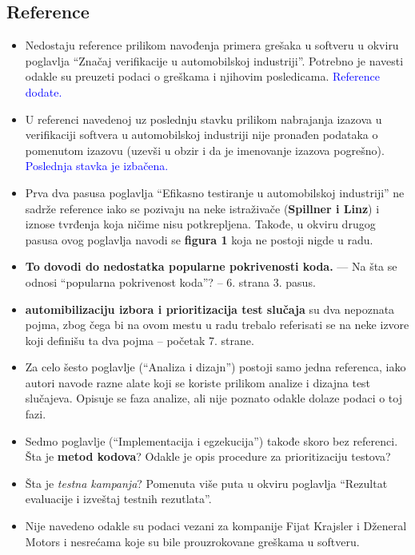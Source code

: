 \documentclass[a4paper]{report}
\newcommand{\odgovor}[1]{\textcolor{blue}{#1}}
\begin{document}
\subsection{Reference}
\begin{itemize}
\item Nedostaju reference prilikom navođenja primera grešaka u softveru u okviru poglavlja ``Značaj verifikacije u automobilskoj industriji''. Potrebno je navesti odakle su preuzeti podaci o greškama i njihovim posledicama. \odgovor{Reference dodate.}
\item U referenci navedenoj uz poslednju stavku prilikom nabrajanja izazova u verifikaciji softvera u automobilskoj industriji nije pronađen podataka o pomenutom izazovu (uzevši u obzir i da je imenovanje izazova pogrešno). \odgovor{Poslednja stavka je izbačena.}
\item Prva dva pasusa poglavlja ``Efikasno testiranje u automobilskoj industriji'' ne sadrže reference iako se pozivaju na neke istraživače ({\bf{Spillner i Linz}}) i iznose tvrđenja koja ničime nisu potkrepljena. Takođe, u okviru drugog pasusa ovog poglavlja navodi se {\bf{figura 1}} koja ne postoji nigde u radu.
\item {\bf{To dovodi do nedostatka popularne pokrivenosti koda.}} --- Na šta se odnosi ``popularna pokrivenost koda''? -- 6. strana 3. pasus. \odgovor{}
\item {\bf{automibilizaciju izbora i prioritizacija test slučaja}} su dva nepoznata pojma, zbog čega bi na ovom mestu u radu trebalo referisati se na neke izvore koji definišu ta dva pojma -- početak 7. strane.
\item Za celo šesto poglavlje (``Analiza i dizajn'') postoji samo jedna referenca, iako autori navode razne alate koji se koriste prilikom analize i dizajna test slučajeva. Opisuje se faza analize, ali nije poznato odakle dolaze podaci o toj fazi.
\item Sedmo poglavlje (``Implementacija i egzekucija'') takođe skoro bez referenci. Šta je {\bf{metod kodova}}? Odakle je opis procedure za prioritizaciju testova?
\item Šta je {\em{testna kampanja}}? Pomenuta više puta u okviru poglavlja ``Rezultat evaluacije i izveštaj testnih rezutlata''.
\item Nije navedeno odakle su podaci vezani za kompanije Fijat Krajsler i Dženeral Motors i nesrećama koje su bile prouzrokovane greškama u softveru.
\end{itemize}
\end{document}
